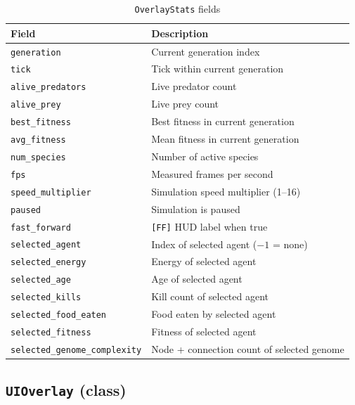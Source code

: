 \begin{table}[H]
\centering\small
\caption{\texttt{OverlayStats} fields}
\begin{tabularx}{\textwidth}{@{}lX@{}}
\toprule
\textbf{Field} & \textbf{Description} \\
\midrule
\texttt{generation}          & Current generation index \\
\texttt{tick}                & Tick within current generation \\
\texttt{alive\_predators}    & Live predator count \\
\texttt{alive\_prey}         & Live prey count \\
\texttt{best\_fitness}       & Best fitness in current generation \\
\texttt{avg\_fitness}        & Mean fitness in current generation \\
\texttt{num\_species}        & Number of active species \\
\texttt{fps}                 & Measured frames per second \\
\texttt{speed\_multiplier}   & Simulation speed multiplier (1–16) \\
\texttt{paused}              & Simulation is paused \\
\texttt{fast\_forward}       & \texttt{[FF]} HUD label when true \\
\texttt{selected\_agent}     & Index of selected agent ($-1$ = none) \\
\texttt{selected\_energy}    & Energy of selected agent \\
\texttt{selected\_age}       & Age of selected agent \\
\texttt{selected\_kills}     & Kill count of selected agent \\
\texttt{selected\_food\_eaten}& Food eaten by selected agent \\
\texttt{selected\_fitness}   & Fitness of selected agent \\
\texttt{selected\_genome\_complexity} & Node + connection count of selected genome \\
\bottomrule
\end{tabularx}
\end{table}

\subsection{\texttt{UIOverlay} (class)}


